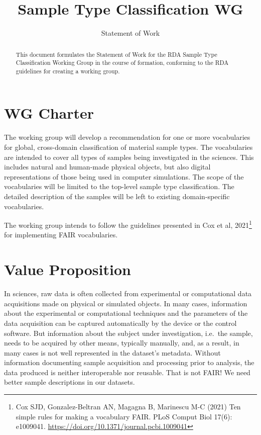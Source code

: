 \documentclass{scrartcl}
\begin{document}
\titlehead{\hfill\texttt{[image: rda-logo]}}
\title{Sample Type Classification WG}
\subtitle{Statement of Work}

\maketitle

\begin{abstract}\noindent
  This document formulates the Statement of Work for the RDA Sample
  Type Classification Working Group in the course of formation,
  conforming to the RDA guidelines for creating a working group.
\end{abstract}

\section{WG Charter}

The working group will develop a recommendation for one or more
vocabularies for global, cross-domain classification of material
sample types.  The vocabularies are intended to cover all types of
samples being investigated in the sciences.  This includes natural and
human-made physical objects, but also digital representations of those
being used in computer simulations.  The scope of the vocabularies
will be limited to the top-level sample type classification.  The
detailed description of the samples will be left to existing
domain-specific vocabularies.

The working group intends to follow the guidelines presented in Cox et
al, 2021\footnote{Cox SJD, Gonzalez-Beltran AN, Magagna B, Marinescu
  M-C (2021) Ten simple rules for making a vocabulary FAIR. PLoS
  Comput Biol 17(6): e1009041.
  \url{https://doi.org/10.1371/journal.pcbi.1009041}} for implementing
FAIR vocabularies.


\section{Value Proposition}

In sciences, raw data is often collected from experimental or
computational data acquisitions made on physical or simulated objects.
In many cases, information about the experimental or computational
techniques and the parameters of the data acquisition can be captured
automatically by the device or the control software.  But information
about the subject under investigation, i.e.\ the sample, needs to be
acquired by other means, typically manually, and, as a result, in many
cases is not well represented in the dataset’s metadata.  Without
information documenting sample acquisition and processing prior to
analysis, the data produced is neither interoperable nor reusable.
That is not FAIR!  We need better sample descriptions in our datasets.
\end{document}
